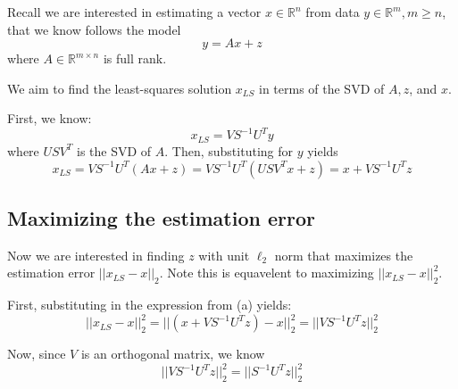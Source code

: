 \documentclass[paper=a4, fontsize=11pt]{scrartcl} %
\numberwithin{equation}{section} %
\numberwithin{figure}{section} %
\numberwithin{table}{section} %
\begin{document}
Recall we are interested in estimating a vector $x \in \mathbb{R}^n$ from data $y \in \mathbb{R}^m, m \geq n$, that we know follows the model
\[y = Ax + z\]
where $A \in \mathbb{R}^{m \times n}$ is full rank.

We aim to find the least-squares solution $x_{LS}$ in terms of the SVD of $A, z$, and $x$.

First, we know:
\[x_{LS} = VS^{-1}U^T y\]
where $USV^T$ is the SVD of $A$.
Then, substituting for $y$ yields
\[x_{LS} = VS^{-1}U^T (Ax + z) = VS^{-1}U^T (USV^Tx + z) = x + VS^{-1}U^Tz \]

\subsection{Maximizing the estimation error}

Now we are interested in finding $z$ with unit $\ell_2$ norm that maximizes the estimation error $||x_{LS} - x||_2$. Note this is equavelent to maximizing $||x_{LS} - x||_2^2$.

First, substituting in the expression from (a) yields:
\[||x_{LS} - x||_2^2 = || (x + VS^{-1}U^Tz) - x||_2^2 = ||VS^{-1}U^Tz ||_2^2 \]

Now, since $V$ is an orthogonal matrix, we know
\[||VS^{-1}U^Tz ||_2^2 = ||S^{-1}U^Tz ||_2^2\]
\end{document}
